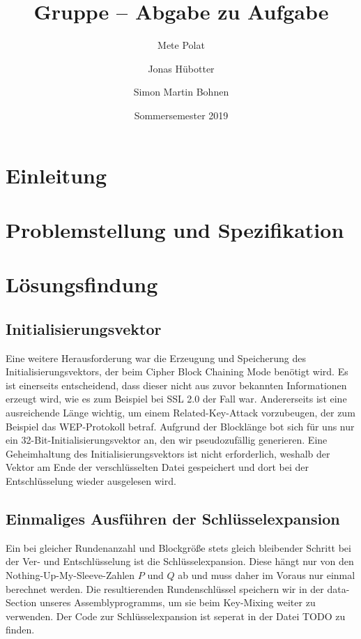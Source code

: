 \documentclass[course=erap]{aspdoc}
\author{Mete Polat \and Jonas Hübotter \and Simon Martin Bohnen}
\date{Sommersemester 2019} %
\title{Gruppe \theGroup{} -- Abgabe zu Aufgabe \theNumber}
\begin{document}
\maketitle

\section{Einleitung}


\section{Problemstellung und Spezifikation}


\section{Lösungsfindung}

\subsection{Initialisierungsvektor}
Eine weitere Herausforderung war die Erzeugung und Speicherung des Initialisierungsvektors, der beim Cipher Block Chaining Mode benötigt wird. Es ist einerseits entscheidend, dass dieser nicht aus zuvor bekannten Informationen erzeugt wird, wie es zum Beispiel bei SSL 2.0 der Fall war. Andererseits ist eine ausreichende Länge wichtig, um einem Related-Key-Attack vorzubeugen, der zum Beispiel das WEP-Protokoll betraf. 
\bigbreak
Aufgrund der Blocklänge bot sich für uns nur ein 32-Bit-Initialisierungsvektor an, den wir pseudozufällig generieren.
Eine Geheimhaltung des Initialisierungsvektors ist nicht erforderlich, weshalb der Vektor am Ende der verschlüsselten Datei gespeichert und dort bei der Entschlüsselung wieder ausgelesen wird.

\subsection{Einmaliges Ausführen der Schlüsselexpansion}
Ein bei gleicher Rundenanzahl und Blockgröße stets gleich bleibender Schritt bei der Ver- und Entschlüsselung ist die Schlüsselexpansion. Diese hängt nur von den Nothing-Up-My-Sleeve-Zahlen $P$ und $Q$ ab und muss daher im Voraus nur einmal berechnet werden. Die resultierenden Rundenschlüssel speichern wir in der data-Section unseres Assemblyprogramms, um sie beim Key-Mixing weiter zu verwenden. Der Code zur Schlüsselexpansion ist seperat in der Datei TODO zu finden.
\end{document}

